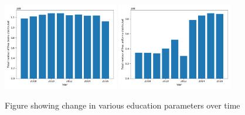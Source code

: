 \documentclass[twoside]{article}
\begin{document}
\begin{figure}[h]
    \includegraphics[width=0.45\textwidth]{TotalTextBookIncentives.png}
    \includegraphics[width=0.45\textwidth]{TotalUniformIncentives.png}
    \caption{Figure showing change in various education parameters over time}
    \label{fig:education_time}
\end{figure}
\end{document}
